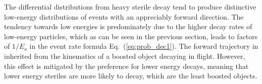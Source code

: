 \documentclass[11pt, a4paper]{article}
\newcommand{\refeq}[1]{Eq.~(\ref{#1})}
\def\muboone{MicroBooNE}
\def\ster{\ensuremath N}
\begin{document}
% 
%
%

The differential distributions from heavy sterile decay tend to produce
distinctive low-energy distributions of events with an appreciably forward
direction. 
%
The tendency towards low energies is predominately due to the higher decay
rates of low-energy particles, which as can be seen in the previous section,
leads to factors of $1/E_\nu$ in the event rate formula \refeq{eq:prob_dec1}.
%
The forward trajectory in inherited from the kinematics of a boosted object
decaying in flight. However, this effect is mitigated by the preference for
lower energy decays, meaning that lower energy steriles are more likely to
decay, which are the least boosted objects.
\end{document}

